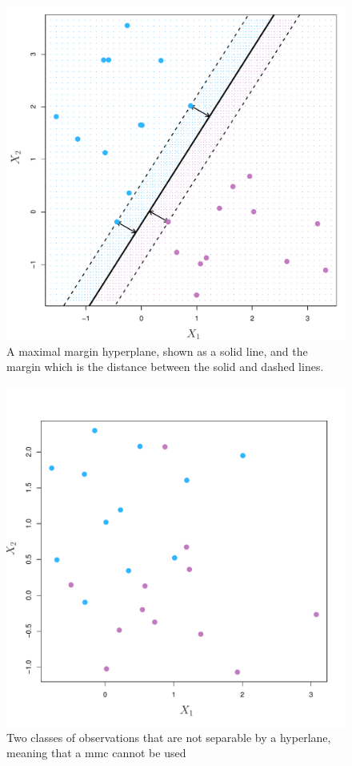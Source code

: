 \documentclass[11pt]{article}
\begin{document}
\begin{figure}[ht]
  \centering
  \includegraphics[width=12cm]{graphics/9_3.pdf}
  \caption{A maximal margin hyperplane, shown as a solid line, and the margin which is the distance between the solid and dashed lines.\cite{jamesSupportVectorMachines}}
\end{figure}

\begin{figure}[ht]
  \centering
  \includegraphics[width=12cm]{graphics/9_4.pdf}
  \caption{Two classes of observations that are not separable by a hyperlane, meaning that a \gls{mmc} cannot be used\cite{jamesSupportVectorMachines}}
\end{figure}
\end{document}

